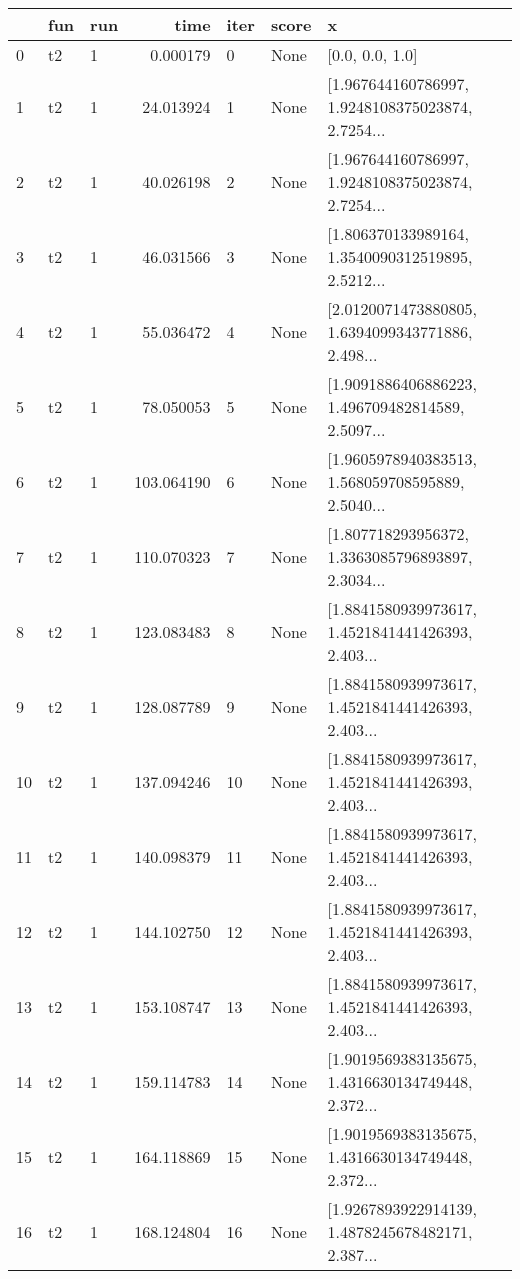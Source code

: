 \begin{tabular}{lllrlll}
\toprule
{} & fun & run &         time & iter & score &                                                  x \\
\midrule
0   &  t2 &   1 &     0.000179 &    0 &  None &                                    [0.0, 0.0, 1.0] \\
1   &  t2 &   1 &    24.013924 &    1 &  None &  [1.967644160786997, 1.9248108375023874, 2.7254... \\
2   &  t2 &   1 &    40.026198 &    2 &  None &  [1.967644160786997, 1.9248108375023874, 2.7254... \\
3   &  t2 &   1 &    46.031566 &    3 &  None &  [1.806370133989164, 1.3540090312519895, 2.5212... \\
4   &  t2 &   1 &    55.036472 &    4 &  None &  [2.0120071473880805, 1.6394099343771886, 2.498... \\
5   &  t2 &   1 &    78.050053 &    5 &  None &  [1.9091886406886223, 1.496709482814589, 2.5097... \\
6   &  t2 &   1 &   103.064190 &    6 &  None &  [1.9605978940383513, 1.568059708595889, 2.5040... \\
7   &  t2 &   1 &   110.070323 &    7 &  None &  [1.807718293956372, 1.3363085796893897, 2.3034... \\
8   &  t2 &   1 &   123.083483 &    8 &  None &  [1.8841580939973617, 1.4521841441426393, 2.403... \\
9   &  t2 &   1 &   128.087789 &    9 &  None &  [1.8841580939973617, 1.4521841441426393, 2.403... \\
10  &  t2 &   1 &   137.094246 &   10 &  None &  [1.8841580939973617, 1.4521841441426393, 2.403... \\
11  &  t2 &   1 &   140.098379 &   11 &  None &  [1.8841580939973617, 1.4521841441426393, 2.403... \\
12  &  t2 &   1 &   144.102750 &   12 &  None &  [1.8841580939973617, 1.4521841441426393, 2.403... \\
13  &  t2 &   1 &   153.108747 &   13 &  None &  [1.8841580939973617, 1.4521841441426393, 2.403... \\
14  &  t2 &   1 &   159.114783 &   14 &  None &  [1.9019569383135675, 1.4316630134749448, 2.372... \\
15  &  t2 &   1 &   164.118869 &   15 &  None &  [1.9019569383135675, 1.4316630134749448, 2.372... \\
16  &  t2 &   1 &   168.124804 &   16 &  None &  [1.9267893922914139, 1.4878245678482171, 2.387... \\

\end{tabular}
